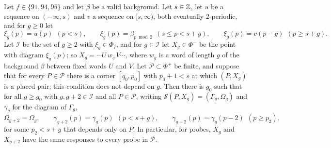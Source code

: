 \begin{proposition}\label{cl:prop:pump}
Let $f\in\{91,94,95\}$ and let $\beta$ be a valid background. Let $s\in\mathbb{Z}$, let $u$ be a sequence on $(-\infty,s)$ and $v$ a sequence on $[s,\infty)$, both eventually $2$-periodic, and for $g\ge0$ let
\[
\xi_g(p)=u(p)\ \ (p<s),\qquad \xi_g(p)=\beta_{p\bmod2}\ \ (s\le p<s+g),\qquad \xi_g(p)=v(p-g)\ \ (p\ge s+g).
\]
Let $\mathcal I$ be the set of $g\ge2$ with $\xi_g\in\Phi_f$, and for $g\in\mathcal I$ let $X_g\in\Phi^-$ be the point with diagram $\xi_g(p)$; so $X_g=\cdots U\,w_g\,V\cdots$, where $w_g$ is a word of length $g$ of the background $\beta$ between fixed words $U$ and $V$. Let $\mathcal P\subset\Phi^+$ be finite, and suppose that for every $P\in\mathcal P$ there is a corner $[q_0,p_0]$ with $p_0+1<s$ at which $(P,X_g)$ is a placed pair; this condition does not depend on $g$. Then there is $g_0$ such that for all $g\ge g_0$ with $g,g+2\in\mathcal I$ and all $P\in\mathcal P$, writing $\mathcal S(P,X_g)=(\Gamma_g,\Omega_g)$ and $\gamma_g$ for the diagram of $\Gamma_g$,
\[
\Omega_{g+2}=\Omega_g,\qquad \gamma_{g+2}(p)=\gamma_g(p)\ \ (p<s+g),\qquad \gamma_{g+2}(p)=\gamma_g(p-2)\ \ (p\ge p_2),
\]
for some $p_2<s+g$ that depends only on $P$. In particular, for probes, $X_g$ and $X_{g+2}$ have the same responses to every probe in $\mathcal P$.
\end{proposition}

